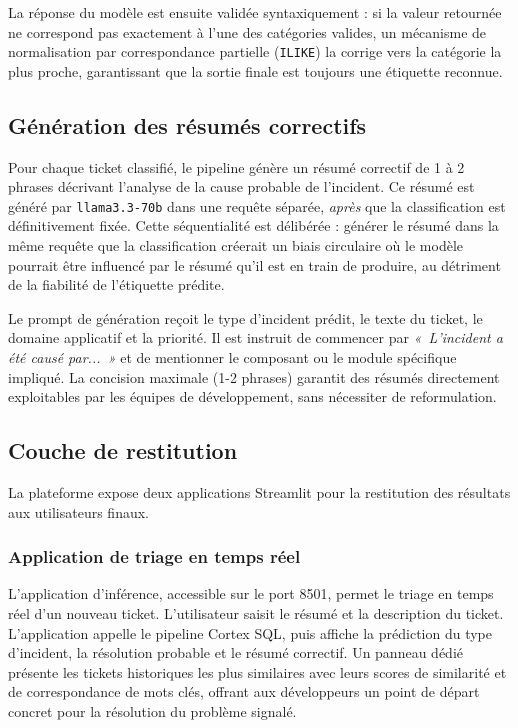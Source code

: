 La réponse du modèle est ensuite validée syntaxiquement : si la valeur retournée ne correspond pas exactement à l'une des catégories valides, un mécanisme de normalisation par correspondance partielle (\texttt{ILIKE}) la corrige vers la catégorie la plus proche, garantissant que la sortie finale est toujours une étiquette reconnue.

\subsection{Génération des résumés correctifs}

Pour chaque ticket classifié, le pipeline génère un résumé correctif de 1 à 2 phrases décrivant l'analyse de la cause probable de l'incident. Ce résumé est généré par \texttt{llama3.3-70b} dans une requête séparée, \textit{après} que la classification est définitivement fixée. Cette séquentialité est délibérée : générer le résumé dans la même requête que la classification créerait un biais circulaire où le modèle pourrait être influencé par le résumé qu'il est en train de produire, au détriment de la fiabilité de l'étiquette prédite.

Le prompt de génération reçoit le type d'incident prédit, le texte du ticket, le domaine applicatif et la priorité. Il est instruit de commencer par \textit{«~L'incident a été causé par...~»} et de mentionner le composant ou le module spécifique impliqué. La concision maximale (1-2 phrases) garantit des résumés directement exploitables par les équipes de développement, sans nécessiter de reformulation.

\subsection{Couche de restitution}

La plateforme expose deux applications Streamlit pour la restitution des résultats aux utilisateurs finaux.

\subsubsection{Application de triage en temps réel}

L'application d'inférence, accessible sur le port 8501, permet le triage en temps réel d'un nouveau ticket. L'utilisateur saisit le résumé et la description du ticket. L'application appelle le pipeline Cortex SQL, puis affiche la prédiction du type d'incident, la résolution probable et le résumé correctif. Un panneau dédié présente les tickets historiques les plus similaires avec leurs scores de similarité et de correspondance de mots clés, offrant aux développeurs un point de départ concret pour la résolution du problème signalé.

